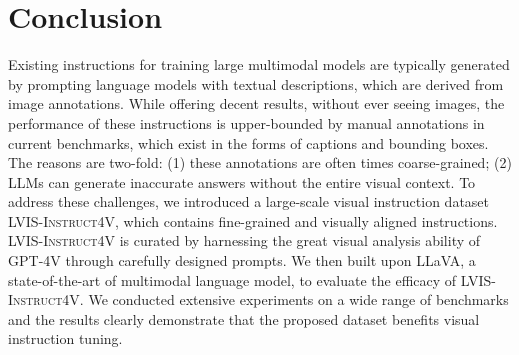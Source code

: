 \documentclass{article}
\newcommand{\dataname}{\textsc{LVIS-Instruct4V}\xspace}
\begin{document}
 \section{Conclusion}
\label{sec:conclusion}
Existing instructions for training large multimodal models are typically generated by prompting language models with textual descriptions, which are derived from image annotations. While offering decent results, without ever seeing images, the performance of these instructions is upper-bounded by manual annotations in current benchmarks, which exist in the forms of captions and bounding boxes.  The reasons are two-fold: (1) these annotations are often times coarse-grained; (2) LLMs can generate inaccurate answers without the entire visual context. To address these challenges, we introduced a large-scale visual instruction dataset \dataname, which contains  fine-grained and visually aligned instructions. \dataname is curated by harnessing the great visual analysis ability of GPT-4V through carefully designed prompts. We then built upon LLaVA, a state-of-the-art of multimodal language model, to evaluate the efficacy of \dataname. We conducted extensive experiments on a wide range of benchmarks and the results clearly demonstrate that the proposed dataset benefits visual instruction tuning. 






\appendix
\onecolumn
\end{document}
